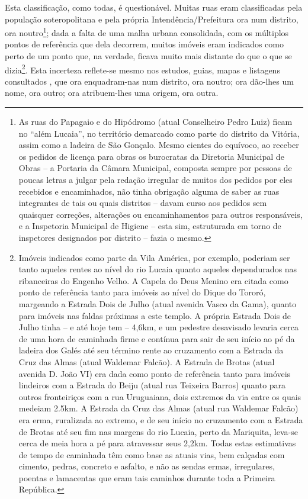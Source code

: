 Esta classificação, como todas, é questionável. Muitas ruas eram classificadas pela população soteropolitana e pela própria Intendência/Prefeitura ora num distrito, ora noutro\footnote{As ruas do Papagaio e do Hipódromo (atual Conselheiro Pedro Luiz) ficam no ``além Lucaia'', no território demarcado como parte do distrito da Vitória, assim como a ladeira de São Gonçalo. Mesmo cientes do equívoco, ao receber os pedidos de licença para obras os burocratas da Diretoria Municipal de Obras -- a Portaria da Câmara Municipal, composta sempre por pessoas de poucas letras a julgar pela redação irregular de muitos dos pedidos por eles recebidos e encaminhados, não tinha obrigação alguma de saber as ruas integrantes de tais ou quais distritos -- davam curso aos pedidos sem quaisquer correções, alterações ou encaminhamentos para outros responsáveis, e a Inspetoria Municipal de Higiene -- esta sim, estruturada em torno de inspetores designados por distrito -- fazia o mesmo.}; dada a falta de uma malha urbana consolidada, com os múltiplos pontos de referência que dela decorrem, muitos imóveis eram indicados como perto de um ponto que, na verdade, ficava muito mais distante do que o que se dizia\footnote{Imóveis indicados como parte da Vila América, por exemplo, poderiam ser tanto aqueles rentes ao nível do rio Lucaia quanto aqueles dependurados nas ribanceiras do Engenho Velho. A Capela do Deus Menino era citada como ponto de referência tanto para imóveis ao nível do Dique do Tororó, margeando a Estrada Dois de Julho (atual avenida Vasco da Gama), quanto para imóveis nas faldas próximas a este templo. A própria Estrada Dois de Julho tinha -- e até hoje tem -- 4,6km, e um pedestre desavisado levaria cerca de uma hora de caminhada firme e contínua para sair de seu início ao pé da ladeira dos Galés até seu término rente ao cruzamento com a Estrada da Cruz das Almas (atual Waldemar Falcão). A Estrada de Brotas (atual avenida D. João VI) era dada como ponto de referência tanto para imóveis lindeiros com a Estrada do Beiju (atual rua Teixeira Barros) quanto para outros fronteiriços com a rua Uruguaiana, dois extremos da via entre os quais medeiam 2.5km. A Estrada da Cruz das Almas (atual rua Waldemar Falcão) era erma, ruralizada ao extremo, e de seu início no cruzamento com a Estrada de Brotas até seu fim nas margens do rio Lucaia, perto da Mariquita, leva-se cerca de meia hora a pé para atravessar seus 2,2km. Todas estas estimativas de tempo de caminhada têm como base as atuais vias, bem calçadas com cimento, pedras, concreto e asfalto, e não as sendas ermas, irregulares, poentas e lamacentas que eram tais caminhos durante toda a Primeira República.}. Esta incerteza reflete-se mesmo nos estudos, guias, mapas e listagens consultados \cite{dorea_ruas_1999, moraes_ruas_1959, municipal_atlas_1955, salvador_mapa_1969, santos_aguas_2010, souza_guia_1935, valladares_beaba_2012, VASCONCELOS2002, weyll_mappa_1851}, que ora enquadram-nas num distrito, ora noutro; ora dão-lhes um nome, ora outro; ora atribuem-lhes uma origem, ora outra.



